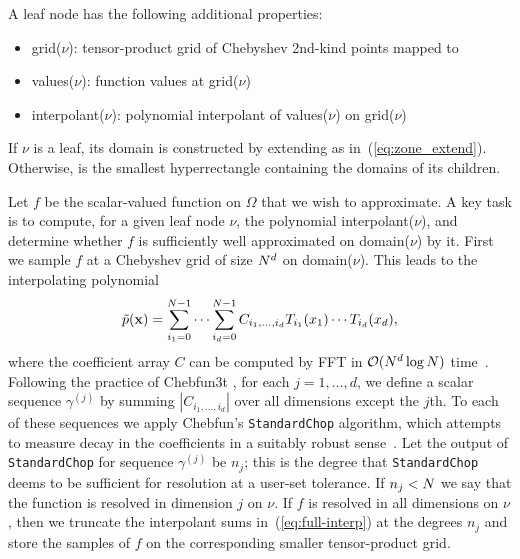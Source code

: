 \noindent A leaf node has the following additional properties:
\begin{itemize}
\item \textsf{grid}($\nu$): tensor-product grid of Chebyshev 2nd-kind points mapped to 
\item \textsf{values}($\nu$): function values at \textsf{grid}($\nu$)
\item \textsf{interpolant}($\nu$): polynomial interpolant of \textsf{values}($\nu$) on \textsf{grid}($\nu$)
\end{itemize}

\noindent If $\nu$ is a leaf, its domain is constructed by extending  as in~(\ref{eq:zone_extend}). Otherwise,  is the smallest hyperrectangle containing the domains of its children. 

Let $f$ be the scalar-valued function on $\Omega$ that we wish to approximate. A key task is to compute, for a given leaf node $\nu$, the polynomial \textsf{interpolant}($\nu$), and determine whether $f$ is sufficiently well approximated on \textsf{domain}($\nu$) by it. First we sample $f$ at a Chebyshev grid of size $N^d$ on \textsf{domain}($\nu$). This leads to the interpolating polynomial
\begin{equation}
  \label{eq:full-interp}
  \tilde{p}(\mathbf{x}) = \sum_{i_1=0}^{N-1} \cdots \sum_{i_d=0}^{N-1}  C_{i_1,\ldots,i_d} T_{i_1}(x_1)\cdots T_{i_d}(x_d),
\end{equation}
where the coefficient array $C$ can be computed by FFT in $\mathcal{O}(N^d \log N)$ time~\cite{mason2002chebyshev}. Following the practice of Chebfun3t \cite{Hashemi2017}, for each $j=1,\ldots,d$, we define a scalar sequence $\gamma^{(j)}$ by summing $|C_{i_1,\ldots,i_d}|$ over all dimensions except the $j$th. To each of these sequences we apply Chebfun's {\tt StandardChop}  algorithm, which attempts to measure decay in the coefficients in a suitably robust sense~\cite{Aurentz:2017:CCS:3034774.2998442}. Let the output of {\tt StandardChop} for sequence $\gamma^{(j)}$ be $n_j$; this is the degree that {\tt StandardChop} deems to be sufficient for resolution at a user-set tolerance.  If $n_j<N$ we say that the function is resolved in dimension $j$ on $\nu$. If $f$ is resolved in all dimensions on $\nu$, then we truncate the interpolant sums in~(\ref{eq:full-interp}) at the degrees $n_j$ and store the samples of $f$ on the corresponding smaller tensor-product grid. 

